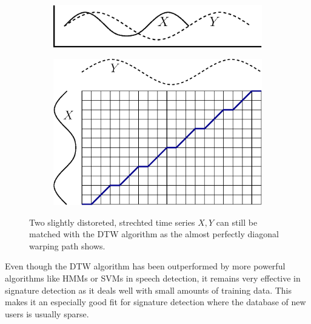 \documentclass[a4paper, oneside]{csthesis}
\begin{document}
\begin{figure}
        \centering
        \begin{subfigure}[b]{0.45\textwidth}
                \centering
                \includegraphics[width=\textwidth]{figures/dtw-graphic1.eps}
                \label{fig:hmm1}
        \end{subfigure}%
        \quad
        \begin{subfigure}[b]{0.45\textwidth}
                \centering
                \includegraphics[width=\textwidth]{figures/dtw-graphic2.eps}
                \label{fig:hmm1}
        \end{subfigure}%

        \caption{Two slightly distoreted, strechted time series $X,Y$ can still be matched with the DTW algorithm as the almost perfectly diagonal warping path shows.}
        \label{fig:dtw-matrix}
\end{figure}



Even though the DTW algorithm has been outperformed by more powerful algorithms like HMMs or SVMs in speech detection, it remains very effective in signature detection as it deals well with small amounts of training data. This makes it an especially good fit for signature detection where the database of new users is usually sparse.
\end{document}
